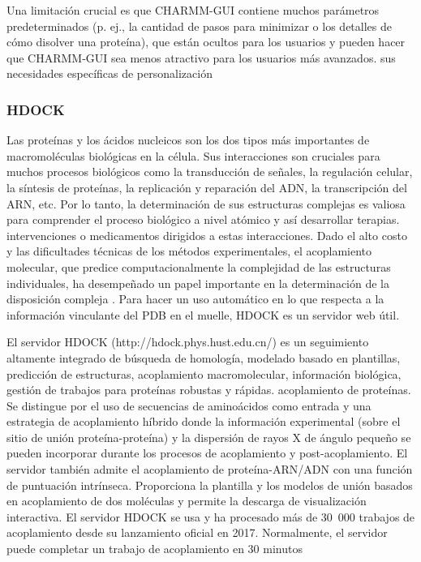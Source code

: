 \documentclass[11pt, letterpaper, spanish]{article}
\begin{document}
{{    \par{Una limitación crucial es que CHARMM-GUI contiene muchos parámetros predeterminados (p. ej., la cantidad de pasos para minimizar o los detalles de cómo disolver una proteína), que están ocultos para los usuarios y pueden hacer que CHARMM-GUI sea menos atractivo para los usuarios más avanzados. sus necesidades específicas de personalización \cite{Jo_2017}}

    \subsubsection{HDOCK}
    \par{Las proteínas y los ácidos nucleicos son los dos tipos más importantes de macromoléculas biológicas en la célula. Sus interacciones son cruciales para muchos procesos biológicos como la transducción de señales, la regulación celular, la síntesis de proteínas, la replicación y reparación del ADN, la transcripción del ARN, etc. Por lo tanto, la determinación de sus estructuras complejas es valiosa para comprender el proceso biológico a nivel atómico y así desarrollar terapias. intervenciones o medicamentos dirigidos a estas interacciones. Dado el alto costo y las dificultades técnicas de los métodos experimentales, el acoplamiento molecular, que predice computacionalmente la complejidad de las estructuras individuales, ha desempeñado un papel importante en la determinación de la disposición compleja \cite{Yan_2017}. Para hacer un uso automático en lo que respecta a la información vinculante del PDB en el muelle, HDOCK es un servidor web útil.}
    
    \par{El servidor HDOCK (http://hdock.phys.hust.edu.cn/) es un seguimiento altamente integrado de búsqueda de homología, modelado basado en plantillas, predicción de estructuras, acoplamiento macromolecular, información biológica, gestión de trabajos para proteínas robustas y rápidas. acoplamiento de proteínas. Se distingue por el uso de secuencias de aminoácidos como entrada y una estrategia de acoplamiento híbrido donde la información experimental (sobre el sitio de unión proteína-proteína) y la dispersión de rayos X de ángulo pequeño se pueden incorporar durante los procesos de acoplamiento y post-acoplamiento. El servidor también admite el acoplamiento de proteína-ARN/ADN con una función de puntuación intrínseca. Proporciona la plantilla y los modelos de unión basados en acoplamiento de dos moléculas y permite la descarga de visualización interactiva. El servidor HDOCK se usa y ha procesado más de 30 000 trabajos de acoplamiento desde su lanzamiento oficial en 2017. Normalmente, el servidor puede completar un trabajo de acoplamiento en 30 minutos}

}}
\end{document}
